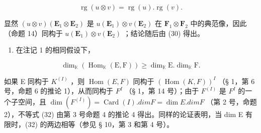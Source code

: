 \[
\operatorname{rg} (u \otimes v) = \operatorname{rg} (u). \operatorname{rg} (v).\tag{31}
\]

显然 \((u\otimes v)(\mathbf{E}_1\otimes \mathbf{E}_2)\) 是 \(u(\mathbf{E}_1)\otimes v(\mathbf{E}_2)\) 在 \(\mathbf{F}_1\otimes \mathbf{F}_2\) 中的典范像，因此（命题 14）同构于 \(u(\mathbf{E}_1)\otimes v(\mathbf{E}_2)\) ；结论随后由 (30) 得出。

\begin{enumerate}
\def\labelenumi{(\arabic{enumi})}
\setcounter{enumi}{2}
\tightlist
\item
  在注记 1 的相同假设下，
\end{enumerate}

\[
\dim_ {\mathbb {K}} (\operatorname{Hom} _ {\mathbb {K}} (\mathrm{E}, \mathrm{F})) \geqslant \dim_ {\mathbb {K}} \mathrm{E}. \dim_ {\mathbb {K}} \mathrm{F}.\tag{32}
\]

如果 E 同构于 \(K^{(I)}\) ，则 \(\operatorname{Hom}(E, F)\) 同构于 \((\operatorname{Hom}(K, F))^{I}\) （§ 1，第 6 号，命题 6 的推论 1），从而同构于 \(F^{I}\) （§ 1，第 14 号）；由于 \(F^{(I)}\) 是 \(F^{I}\) 的一个子空间，且 \(\dim(F^{(I)}) = \operatorname{Card}(I).dim F = \dim E. dim F\) （第 2 号，命题 2），不等式 (32) 由第 3 号命题 4 的推论 4 得出。同样的论证表明，当 dim E 有限时，(32) 的两边相等（参见 § 10，第 3 和第 4 号）。

